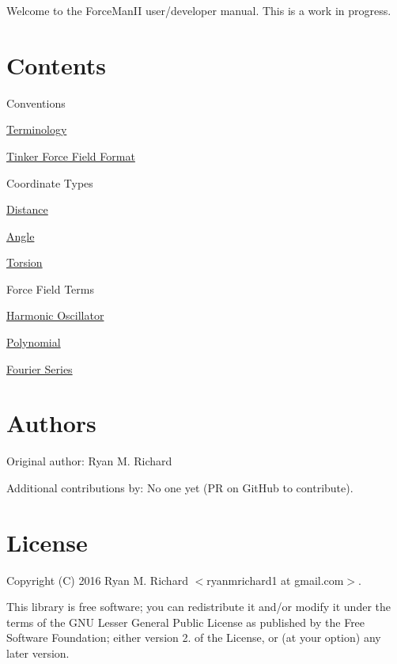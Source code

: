 Welcome to the Force\+Man\+II user/developer manual. This is a work in progress.\hypertarget{index_main_sec}{}\section{Contents}\label{index_main_sec}

\begin{DoxyItemize}
\item Conventions
\begin{DoxyItemize}
\item \hyperlink{terminology}{Terminology}
\item \hyperlink{tinkerformat}{Tinker Force Field Format}
\end{DoxyItemize}
\item Coordinate Types
\begin{DoxyItemize}
\item \hyperlink{distance}{Distance}
\item \hyperlink{angle}{Angle}
\item \hyperlink{torsion}{Torsion}
\end{DoxyItemize}
\item Force Field Terms
\begin{DoxyItemize}
\item \hyperlink{HO}{Harmonic Oscillator}
\item \hyperlink{polynomial}{Polynomial}
\item \hyperlink{fourier}{Fourier Series}
\end{DoxyItemize}
\end{DoxyItemize}\hypertarget{index_Authors}{}\section{Authors}\label{index_Authors}

\begin{DoxyItemize}
\item Original author\+: Ryan M. Richard
\item Additional contributions by\+: No one yet (PR on Git\+Hub to contribute).
\end{DoxyItemize}\hypertarget{index_license_sec}{}\section{License}\label{index_license_sec}
Copyright (C) 2016 Ryan M. Richard $<$ryanmrichard1 at gmail.\+com$>$.

This library is free software; you can redistribute it and/or modify it under the terms of the G\+NU Lesser General Public License as published by the Free Software Foundation; either version 2. of the License, or (at your option) any later version.

